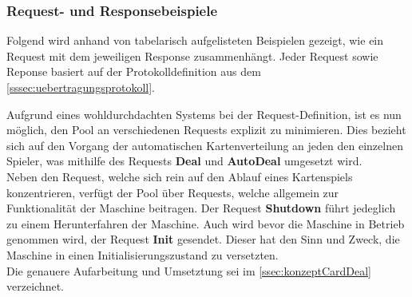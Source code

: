 \subsubsection{Request- und Responsebeispiele}
Folgend wird anhand von tabelarisch aufgelisteten Beispielen gezeigt, wie ein Request mit dem jeweiligen Response zusammenhängt.
Jeder Request sowie Reponse basiert auf der Protokolldefinition aus dem \autoref{sssec:uebertragungsprotokoll}.
\begin{table}[H]
\centering
{}
\caption{Request- und Responsebeispiele Tabellarisch dargestellt}
\end{table}
Aufgrund eines wohldurchdachten Systems bei der Request-Definition, ist es nun möglich, den Pool an verschiedenen Requests explizit zu minimieren.
Dies bezieht sich auf den Vorgang der automatischen Kartenverteilung an jeden den einzelnen Spieler, was mithilfe des Requests \textbf{Deal} und \textbf{AutoDeal} umgesetzt wird.\\
Neben den Request, welche sich rein auf den Ablauf eines Kartenspiels konzentrieren, verfügt der Pool über Requests, welche allgemein zur Funktionalität der Maschine beitragen.
Der Request \textbf{Shutdown} führt jedeglich zu einem Herunterfahren der Maschine.
Auch wird bevor die Maschine in Betrieb genommen wird, der Request \textbf{Init} gesendet.
Dieser hat den Sinn und Zweck, die Maschine in einen Initialisierungszustand zu versetzten.\\
Die genauere Aufarbeitung und Umsetztung sei im \autoref{ssec:konzeptCardDeal} verzeichnet.
